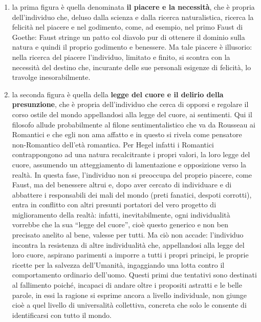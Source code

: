 \documentclass[a4paper,12pt,oneside,openany]{book}%
\begin{document}
\begin{enumerate}
	\item la prima figura è quella denominata \textbf{il piacere e la necessità}, che è propria dell’individuo che, deluso dalla scienza e dalla ricerca naturalistica, ricerca la felicità nel piacere e nel godimento, come, ad esempio, nel primo Faust di Goethe: Faust stringe un patto col diavolo pur di ottenere il dominio sulla natura e quindi il proprio godimento e benessere. Ma tale piacere è illusorio: nella ricerca del piacere l’individuo, limitato e finito, si scontra con la necessità del destino che, incurante delle sue personali esigenze di felicità, lo travolge inesorabilmente.
	\item la seconda figura è quella della \textbf{legge del cuore e il delirio della presunzione}, che è propria dell’individuo che cerca di opporsi e regolare il corso ostile del mondo appellandosi alla legge del cuore, ai sentimenti. Qui il filosofo allude probabilmente al filone sentimentalistico che va da Rousseau ai Romantici e che egli non ama affatto e in questo si rivela come pensatore non-Romantico dell’età romantica. Per Hegel infatti i Romantici contrappongono ad una natura recalcitrante i propri valori, la loro legge del cuore, assumendo un atteggiamento di lamentazione e opposizione verso la realtà. In questa fase, l’individuo non si preoccupa del proprio piacere, come Faust, ma del benessere altrui e, dopo aver cercato di individuare e di abbattere i responsabili dei mali del mondo (preti fanatici, despoti corrotti), entra in conflitto con altri presunti portatori del vero progetto di miglioramento della realtà: infatti, inevitabilmente, ogni individualità vorrebbe che la sua “legge del cuore”, cioè questo generico e non ben precisato anelito al bene, valesse per tutti. Ma ciò non accade: l’individuo incontra la resistenza di altre individualità che, appellandosi alla legge del loro cuore, aspirano parimenti a imporre a tutti i propri principi, le proprie ricette per la salvezza dell’Umanità, ingaggiando una lotta contro il comportamento ordinario dell’uomo.
	Questi primi due tentativi sono destinati al fallimento poiché, incapaci di andare oltre i propositi astratti e le belle parole, in essi la ragione si esprime ancora a livello individuale, non giunge cioè a quel livello di universalità collettiva, concreta che solo le consente di identificarsi con tutto il mondo.

\end{enumerate}
\end{document}

